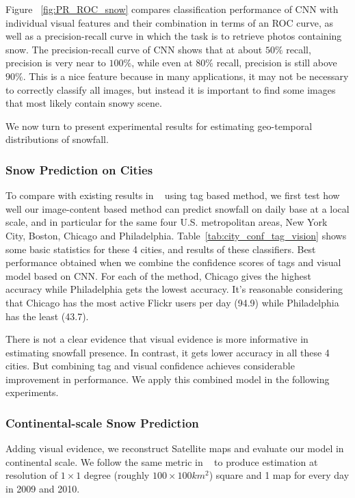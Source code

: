 Figure ~\ref{fig:PR_ROC_snow} compares classification performance of CNN with 
individual visual features and their combination in terms of an ROC curve, 
as well as a precision-recall curve in which the task is to retrieve photos containing snow.
The precision-recall curve of CNN shows that at about $50\%$ recall, precision is very near to $100\%$, 
while even at $80\%$ recall, precision is still above $90\%$. This is a nice feature because 
in many applications, it may not be necessary to correctly 
classify all images, but instead it is important to find some images that most likely contain snowy 
scene.

We now turn to present experimental results for estimating geo-temporal distributions of snowfall.

\subsubsection{Snow Prediction on Cities}
To compare with existing results in ~\cite{wang2013observing} using tag based method,
we first test how well our image-content based method can predict snowfall on daily base at a local scale, 
and in particular 
for the same four U.S. metropolitan areas, New York City, Boston, Chicago and Philadelphia. 
Table~\ref{tab:city_conf_tag_vision} 
shows some basic statistics for these 4 cities, and results of these classifiers. 
Best performance obtained when we combine 
the confidence scores of tags and visual model based on CNN. For each of the method, 
Chicago gives the highest accuracy while Philadelphia gets the lowest accuracy. 
It's reasonable considering that Chicago has the most active Flickr users per
day (94.9) while Philadelphia has the least (43.7). 

There is not a clear evidence that visual evidence is more informative in estimating snowfall 
presence. In contrast, it gets lower accuracy in all these 4 cities. But combining tag and visual 
confidence achieves considerable improvement in performance. We apply this combined model 
in the following experiments.

\subsubsection{Continental-scale Snow Prediction}
Adding visual evidence, we reconstruct Satellite maps and 
evaluate our model in continental scale. We follow the same metric in ~\cite{ecology2012www} to produce 
estimation at resolution of $1 \times 1$ degree (roughly $100 \times 100 km^2$) square and 1 map for 
every day in 2009 and 2010.

